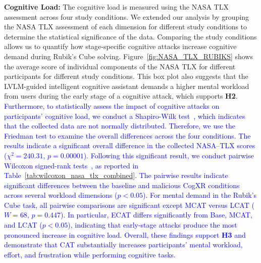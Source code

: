 \documentclass[sigconf,review,anonymous]{acmart}
\begin{document}
\textbf{Cognitive Load:} The cognitive load is measured using the NASA TLX assessment across four study conditions. We extended our analysis by grouping the NASA TLX assessment of each dimension for different study conditions to determine the statistical significance of the data. Comparing the study conditions allows us to quantify how stage‑specific cognitive attacks increase cognitive demand during Rubik’s Cube solving. Figure~\ref{fig:NASA_TLX_RUBIKS} shows the average score of individual components of the NASA TLX for different participants for different study conditions. This box plot also suggests that the LVLM-guided intelligent cognitive assistant demands a higher mental workload from users during the early stage of a cognitive attack, which supports \textbf{H2}. \textcolor{blue}{Furthermore, to statistically assess the impact of cognitive attacks on participants' cognitive load, we conduct a Shapiro-Wilk test~\cite{razali2011power}, which indicates that the collected data are not normally distributed. Therefore, we use the Friedman test to examine the overall differences across the four conditions. The results indicate a significant overall difference in the collected NASA--TLX scores ($\chi^2 = 240.31$, $p = 0.00001$). Following this significant result, we conduct pairwise Wilcoxon signed-rank tests~\cite{taheri2013generalization}, as reported in Table~\ref{tab:wilcoxon_nasa_tlx_combined}. The pairwise results indicate significant differences between the baseline and malicious CogXR conditions across several workload dimensions ($p < 0.05$). For mental demand in the Rubik's Cube task, all pairwise comparisons are significant except MCAT versus LCAT ($W = 68$, $p = 0.447$). In particular, ECAT differs significantly from Base, MCAT, and LCAT ($p < 0.05$), indicating that early-stage attacks produce the most pronounced increase in cognitive load. Overall, these findings support \textbf{H3} and demonstrate that CAT substantially increases participants' mental workload, effort, and frustration while performing cognitive tasks.}
\end{document}
